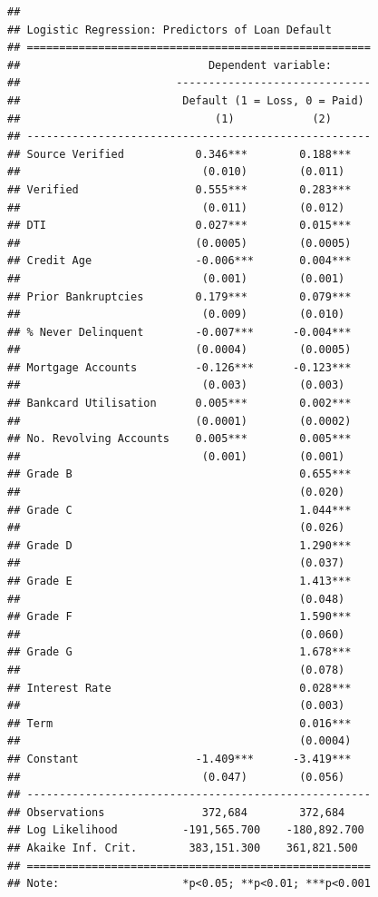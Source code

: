 \documentclass[11pt,preprint]{elsarticle}
\numberwithin{equation}{section}
\numberwithin{figure}{section}
\numberwithin{table}{section}
\begin{document}
\begin{verbatim}
## 
## Logistic Regression: Predictors of Loan Default
## =====================================================
##                             Dependent variable:      
##                        ------------------------------
##                         Default (1 = Loss, 0 = Paid) 
##                              (1)            (2)      
## -----------------------------------------------------
## Source Verified           0.346***        0.188***   
##                            (0.010)        (0.011)    
## Verified                  0.555***        0.283***   
##                            (0.011)        (0.012)    
## DTI                       0.027***        0.015***   
##                           (0.0005)        (0.0005)   
## Credit Age                -0.006***       0.004***   
##                            (0.001)        (0.001)    
## Prior Bankruptcies        0.179***        0.079***   
##                            (0.009)        (0.010)    
## % Never Delinquent        -0.007***      -0.004***   
##                           (0.0004)        (0.0005)   
## Mortgage Accounts         -0.126***      -0.123***   
##                            (0.003)        (0.003)    
## Bankcard Utilisation      0.005***        0.002***   
##                           (0.0001)        (0.0002)   
## No. Revolving Accounts    0.005***        0.005***   
##                            (0.001)        (0.001)    
## Grade B                                   0.655***   
##                                           (0.020)    
## Grade C                                   1.044***   
##                                           (0.026)    
## Grade D                                   1.290***   
##                                           (0.037)    
## Grade E                                   1.413***   
##                                           (0.048)    
## Grade F                                   1.590***   
##                                           (0.060)    
## Grade G                                   1.678***   
##                                           (0.078)    
## Interest Rate                             0.028***   
##                                           (0.003)    
## Term                                      0.016***   
##                                           (0.0004)   
## Constant                  -1.409***      -3.419***   
##                            (0.047)        (0.056)    
## -----------------------------------------------------
## Observations               372,684        372,684    
## Log Likelihood          -191,565.700    -180,892.700 
## Akaike Inf. Crit.        383,151.300    361,821.500  
## =====================================================
## Note:                   *p<0.05; **p<0.01; ***p<0.001
\end{verbatim}
\end{document}
